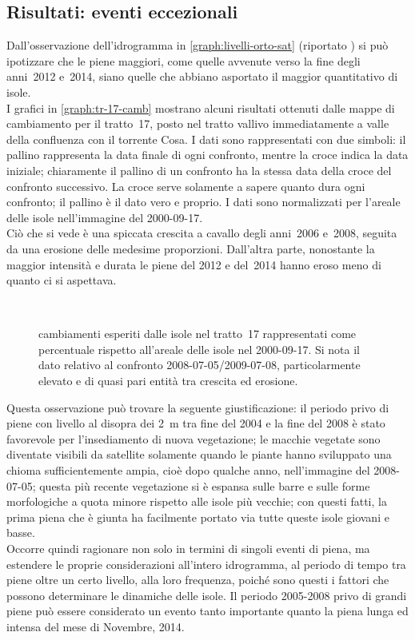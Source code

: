 \subsection{Risultati: eventi eccezionali}
Dall'osservazione dell'idrogramma in \vref{graph:livelli-orto-sat} (riportato ) si può ipotizzare che le piene maggiori, come quelle avvenute verso la fine degli anni~2012 e~2014, siano quelle che abbiano asportato il maggior quantitativo di isole.
\\
I grafici in \vref{graph:tr-17-camb} mostrano alcuni risultati ottenuti dalle mappe di cambiamento per il tratto~17, posto nel tratto vallivo immediatamente a valle della confluenza con il torrente Cosa.
I dati sono rappresentati con due simboli: il pallino rappresenta la data finale di ogni confronto, mentre la croce indica la data iniziale; 
chiaramente il pallino di un confronto ha la stessa data della croce del confronto successivo. 
La croce serve solamente a sapere quanto dura ogni confronto; il pallino è il dato vero e proprio.
I dati sono normalizzati per l'areale delle isole nell'immagine \AST{} del 2000-09-17.
\\
Ciò che si vede è una spiccata crescita a cavallo degli anni~2006 e~2008, seguita da una erosione delle medesime proporzioni.
Dall'altra parte, nonostante la maggior intensità e durata le piene del 2012 e del~2014 hanno eroso meno di quanto ci si aspettava.
%
\begin{figure}
	\centering
	
	\\
	
	\caption[cambiamenti esperiti dalle isole nel tratto~17]{cambiamenti esperiti dalle isole nel tratto~17 rappresentati come percentuale rispetto all'areale delle isole nel 2000-09-17. 
	Si nota il dato relativo al confronto 2008-07-05/2009-07-08, particolarmente elevato e di quasi pari entità tra crescita ed erosione.}
	\label{graph:tr-17-camb}
\end{figure}
%
Questa osservazione può trovare la seguente giustificazione: il periodo privo di piene con livello al disopra dei \SI{2}{\m} tra fine del 2004 e la fine del 2008 è stato favorevole per l'insediamento di nuova vegetazione;
le macchie vegetate sono diventate visibili da satellite solamente quando le piante hanno sviluppato una chioma sufficientemente ampia, cioè dopo qualche anno, nell'immagine del 2008-07-05;
questa più recente vegetazione si è espansa sulle barre e sulle forme morfologiche a quota minore rispetto alle isole più vecchie;
con questi fatti, la prima piena che è giunta ha facilmente portato via tutte queste isole giovani e basse.
\\
Occorre quindi ragionare non solo in termini di singoli eventi di piena, ma estendere le proprie considerazioni all'intero idrogramma, al periodo di tempo tra piene oltre un certo livello, alla loro frequenza, poiché sono questi i fattori che possono determinare le dinamiche delle isole.
Il periodo 2005-2008 privo di grandi piene può essere considerato un evento tanto importante quanto la piena lunga ed intensa del mese di Novembre, 2014.

